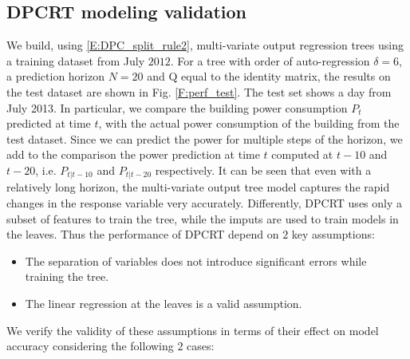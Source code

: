 \subsection{DPCRT modeling validation}

\textcolor[rgb]{1.00,0.00,0.00}{We build, using \eqref{E:DPC_split_rule2}, multi-variate output regression trees using a training dataset from July $2012$. For a tree with order of auto-regression $\delta = 6$, a prediction horizon $N = 20$ and $\mathrm{Q}$ equal to the identity matrix, the results on the test dataset are shown in Fig. \ref{F:perf_test}. The test set shows a day from July 2013. In particular, we compare the building power consumption $P_t$ predicted at time $t$, with the actual power consumption of the building from the test dataset. Since we can predict the power for multiple steps of the horizon, we add to the comparison the power prediction at time $t$ computed at $t-10$ and $t-20$, i.e. $P_{t|t-10}$ and $P_{t|t-20}$ respectively. It can be seen that even with a relatively long horizon, the multi-variate output tree model captures the rapid changes in the response variable very accurately. Differently, DPCRT uses only a subset of features to train the tree, while the imputs are used to train models in the leaves. Thus the performance of DPCRT depend on $2$ key assumptions:
\begin{itemize}[leftmargin=1cm]
	\item The separation of variables does not introduce significant errors while training the tree.
	\item The linear regression at the leaves is a valid assumption.
\end{itemize}
We verify the validity of these assumptions in terms of their effect on model accuracy considering the following $2$ cases:}

